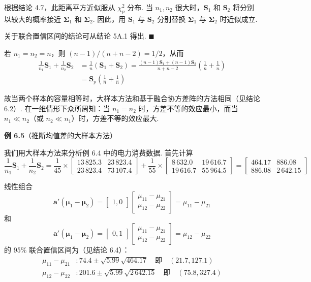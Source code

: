 根据结论 4.7，此距离平方近似服从 $\chi_p^2$ 分布. 当 $n_1,n_2$ 很大时，$\mathbf{S}_1$ 和 $\mathbf{S}_2$ 将分别以较大的概率接近 $\boldsymbol{\Sigma}_1$ 和 $\boldsymbol{\Sigma}_2$. 因此，用 $\mathbf{S}_1$ 与 $\mathbf{S}_2$ 分别替换 $\boldsymbol{\Sigma}_1$ 与 $\boldsymbol{\Sigma}_2$ 时近似成立.

关于联合置信区间的结论可从结论 5A.1 得出. \hfill$\blacksquare$

\quad 若 $n_1=n_2=n$，则 $(n-1)/(n+n-2)=1/2$，从而
\begin{align*}
\frac{1}{n_1}\mathbf{S}_1+\frac{1}{n_2}\mathbf{S}_2&=\frac{1}{n}(\mathbf{S}_1+\mathbf{S}_2)=\frac{(n-1)\mathbf{S}_1+(n-1)\mathbf{S}_2}{n+n-2}\left(\frac{1}{n}+\frac{1}{n}\right)\\
&=\mathbf{S}_p\left(\frac{1}{n}+\frac{1}{n}\right)
\end{align*}

故当两个样本的容量相等时，大样本方法和基于融合协方差阵的方法相同（见结论 6.2）. 在一维情形下众所周知：当 $n_1=n_2$ 时，方差不等的效应最小，而当 $n_1\ll n_2$（或 $n_2\ll n_1$）时，方差不等的效应最大.

\noindent\textbf{例 6.5}\quad （推断均值差的大样本方法）

我们用大样本方法来分析例 6.4 中的电力消费数据. 首先计算
\[
\frac{1}{n_1}\mathbf{S}_1+\frac{1}{n_2}\mathbf{S}_2=\frac{1}{45}\times\begin{bmatrix}13\,825.3&23\,823.4\\23\,823.4&73\,107.4\end{bmatrix}+\frac{1}{55}\times\begin{bmatrix}8\,632.0&19\,616.7\\19\,616.7&55\,964.5\end{bmatrix}=\begin{bmatrix}464.17&886.08\\886.08&2\,642.15\end{bmatrix}
\]

线性组合
\[
\mathbf{a}'(\boldsymbol{\mu}_1-\boldsymbol{\mu}_2)=\begin{bmatrix}1,0\end{bmatrix}\begin{bmatrix}\mu_{11}-\mu_{21}\\\mu_{12}-\mu_{22}\end{bmatrix}=\mu_{11}-\mu_{21}
\]
和
\[
\mathbf{a}'(\boldsymbol{\mu}_1-\boldsymbol{\mu}_2)=\begin{bmatrix}0,1\end{bmatrix}\begin{bmatrix}\mu_{11}-\mu_{21}\\\mu_{12}-\mu_{22}\end{bmatrix}=\mu_{12}-\mu_{22}
\]
的 95\% 联合置信区间为（见结论 6.4）：
\begin{align*}
\mu_{11}-\mu_{21}&: 74.4\pm\sqrt{5.99}\sqrt{464.17}\quad 即\quad (21.7,127.1)\\
\mu_{12}-\mu_{22}&: 201.6\pm\sqrt{5.99}\sqrt{2\,642.15}\quad 即\quad (75.8,327.4)
\end{align*}

